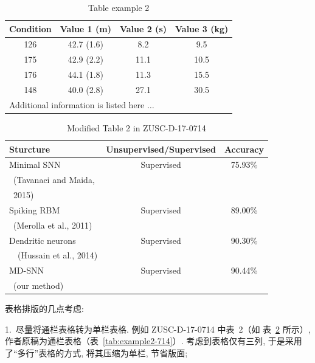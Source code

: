 \documentclass[twoside,twocolumn]{article}
\begin{document}
\begin{CJK}{UTF8}{song}
\begin{table}[!b]
	\footnotesize
	\centering
	\caption{Table example 2}
	\label{tab:example1}
	\begin{tabular}{cccc}
		\toprule[0.75pt]
		Condition & Value 1 (m) & Value 2 (s) & Value 3 (kg)\\
		\midrule[0.5pt]
		126    & 42.7 (1.6) &   \phantom{1}8.2    &\phantom{1}9.5  \\
		175    & 42.9 (2.2) &             11.1    & 10.5           \\
		176    & 44.1 (1.8) &             11.3    & 15.5           \\
		148    & 40.0 (2.8) &             27.1    & 30.5           \\
		\bottomrule[0.75pt]
		\multicolumn{4}{l}{\scriptsize Additional information is listed here $\ldots$}
	\end{tabular}
\end{table}

\begin{table}[!b]
	\footnotesize
	\centering
	\caption{Modified Table 2 in ZUSC-D-17-0714}
	\label{tab:example2-714M}
	\begin{tabular*}{7.9cm}{@{\extracolsep{\fill}}l@{}c@{}c@{}}
		\toprule[0.75pt]
		Sturcture & Unsupervised/Supervised & Accuracy\\
		\midrule[0.5pt]
		Minimal SNN                & Supervised  & 75.93\%  \\
		\  (Tavanaei and Maida,       & & \\
		\ 2015)                      & & \\
		Spiking RBM                & Supervised  & 89.00\%  \\
		\  (Merolla et al., 2011) & &\\
		Dendritic neurons          & Supervised  & 90.30\%  \\
		\ \ (Hussain et al., 2014)     & & \\
		MD-SNN                     & Supervised  & 90.44\%  \\
		\  (our method) & & \\
		\bottomrule[0.75pt]
	\end{tabular*}
\end{table}


表格排版的几点考虑: 

1.~尽量将通栏表格转为单栏表格. 例如 ZUSC-D-17-0714 中表~2（如 表~\ref{tab:example2-714M} 所示）, 
作者原稿为通栏表格（表~\ref{tab:example2-714}）. 
考虑到表格仅有三列, 于是采用了“多行”表格的方式, 
将其压缩为单栏, 节省版面;



\end{CJK}
\end{document}
